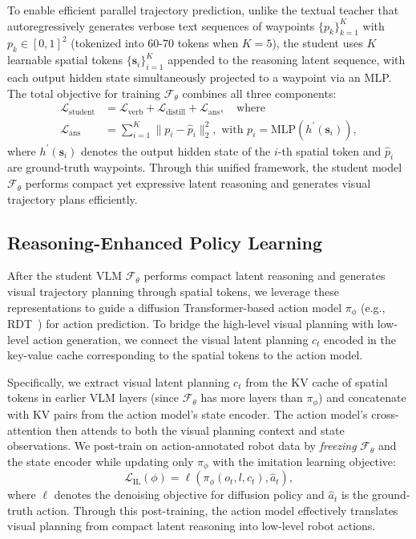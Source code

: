 To enable efficient parallel trajectory prediction, unlike the textual teacher that autoregressively generates verbose text sequences of waypoints $\{p_k\}_{k=1}^K$ with $p_k \in [0, 1]^2$ (tokenized into 60-70 tokens when $K=5$), the student uses $K$ learnable spatial tokens $\{\mathbf{s}_i\}_{i=1}^K$ appended to the reasoning latent sequence, with each output hidden state simultaneously projected to a waypoint via an MLP. The total objective for training $\mathcal{F}_\theta$ combines all three components:
\begin{equation}
\begin{aligned}
    \mathcal{L}_{\text{student}} &= \mathcal{L}_{\text{verb}} + \mathcal{L}_{\text{distill}} + \mathcal{L}_{\text{ans}}, \quad \text{where } \\
     \mathcal{L}_{\text{ans}} &= \sum_{i=1}^K \| p_i - \hat{p}_i \|_2^2, \text{ with } p_i = \text{MLP}(h^\prime(\mathbf{s}_i)),
\end{aligned}
\end{equation}
where $h^\prime(\mathbf{s}_i)$ denotes the output hidden state of the $i$-th spatial token and $\hat{p}_i$ are ground-truth waypoints. Through this unified framework, the student model $\mathcal{F}_\theta$ performs compact yet expressive latent reasoning and generates visual trajectory plans efficiently.






\subsection{Reasoning-Enhanced Policy Learning}\label{ssec:action}
After the student VLM $\mathcal{F}_\theta$ performs compact latent reasoning and generates visual trajectory planning through spatial tokens, we leverage these representations to guide a diffusion Transformer-based action model $\pi_\phi$ (e.g., RDT~\cite{liu2024rdt}) for action prediction. To bridge the high-level visual planning with low-level action generation, we connect the visual latent planning $c_t$ encoded in the key-value cache corresponding to the spatial tokens to the action model.

Specifically, we extract visual latent planning $c_t$ from the KV cache of spatial tokens in earlier VLM layers (since $\mathcal{F}_\theta$ has more layers than $\pi_\phi$) and concatenate with KV pairs from the action model's state encoder. The action model's cross-attention then attends to both the visual planning context and state observations. We post-train on action-annotated robot data by \textit{freezing} $\mathcal{F}_\theta$ and the state encoder while updating only $\pi_\phi$ with the imitation learning objective:
\begin{equation}
\mathcal{L}_{\text{IL}}(\phi) =  \ell\left(\pi_\phi(o_t, l, c_{t}), \hat{a}_t \right),
\end{equation}
where $\ell$ denotes the denoising objective for diffusion policy and $\hat{a}_t$ is the ground-truth action. Through this post-training, the action model effectively translates visual planning from compact latent reasoning into low-level robot actions.


